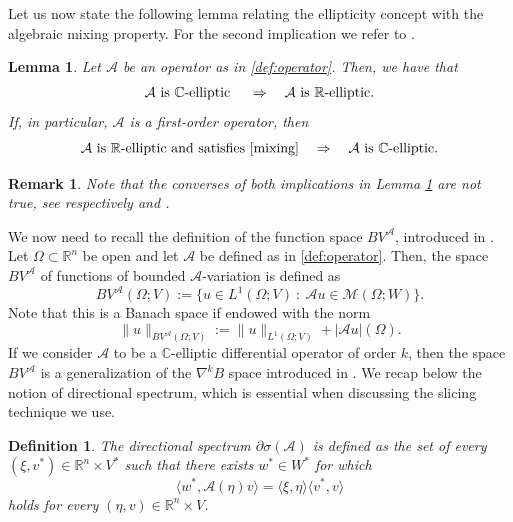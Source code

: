 \documentclass[11pt,reqno]{amsart}
\theoremstyle{plain}
\newtheorem{lemma}[theorem]{Lemma}
\newtheorem{remark}[theorem]{Remark}
\newtheorem{definition}[theorem]{Definition}
\theoremstyle{definition}
\theoremstyle{remark}
\numberwithin{equation}{section}
\newcommand{\R}{\mathbb{R}}
\newcommand{\C}{\mathbb{C}}
\newcommand{\M}{\mathcal{M}}
\newcommand{\A}{\mathcal{A}}
\newcommand{\1}{\mathbbm{1}} %
\newcommand{\st}{\ : \ }
\begin{document}
Let us now state the following lemma relating the ellipticity concept with the algebraic mixing property. For the second implication we refer to \cite[Remark 3.1]{AR20}.

\begin{lemma}
\label{lmm:ellipticities}
    Let $\A$ be an operator as in \eqref{def:operator}. Then, we have that
    \begin{equation*}
        \A \textnormal{ is } \C \textnormal{-elliptic } \quad \Rightarrow \quad \A \textnormal{ is } \R \textnormal{-elliptic}.
    \end{equation*}
    If, in particular, $\A$ is a first-order operator, then
    \begin{equation*}
        \A \textnormal{ is } \R \textnormal{-elliptic and satisfies \eqref{mixing}} \quad \Rightarrow \quad \A \textnormal{ is } \C \textnormal{-elliptic}.
    \end{equation*}
\end{lemma}

\begin{remark}
    Note that the converses of both implications in Lemma \ref{lmm:ellipticities} are not true, see respectively \cite[Example 2.2 (c)]{BDG20} and \cite[Examples 10.1 and 10.2]{AR20}.
\end{remark}

We now need to recall the definition of the function space $BV^\A$, introduced in \cite{GR19_0}. Let $\Omega \subset \R^n$ be open and let $\A$ be defined as in \eqref{def:operator}. 
Then, the space $BV^\A$ of functions of bounded $\A$-variation is defined as
\begin{equation}
\label{BVA}
    BV^\A(\Omega;V) := \{u \in L^1(\Omega;V) \st \A u \in \M(\Omega;W)\}.
\end{equation}
Note that this is a Banach space if endowed with the norm
\begin{equation*}
    \|u\|_{BV^\A(\Omega;V)} := \|u\|_{L^1(\Omega;V)} + |\A u|(\Omega).
\end{equation*}
If we consider $\A$ to be a $\C$-elliptic differential operator of order $k$, then the space $BV^\A$ is a generalization of the $\nabla^k B$ space introduced in \cite{DT84}. We recap below the notion of directional spectrum, which is essential when discussing the slicing technique we use. 
\begin{definition}\label{def:directional_spectrum}
    The {directional spectrum} $\partial \sigma(\A)$ is defined as the set of every $(\xi, v^*) \in \R^n \times V^*$ such that there exists $w^* \in W^*$ for which 
    \[
        \langle w^*, \A(\eta)v\rangle = \langle \xi, \eta \rangle \langle v^*, v \rangle
    \]
    holds for every $(\eta, v) \in \R^n \times V$.
\end{definition}
\end{document}
